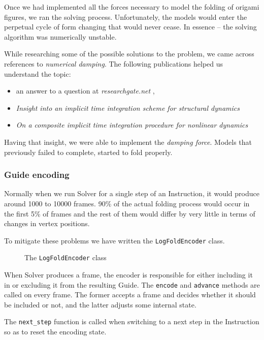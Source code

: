 Once we had implemented all the forces necessary to model the folding of origami figures, we ran the solving process.
Unfortunately, the models would enter the perpetual cycle of form changing that would never cease.
In essence -- the solving algorithm was numerically unstable.

While researching some of the possible solutions to the problem, 
we came across references to \textit{numerical damping}. 
The following publications helped us understand the topic: 

\begin{itemize}
	\item an answer to a question at \textit{researchgate.net} \cite{researchgate:what-is-damping},
	\item \textit{Insight into an implicit time integration scheme for structural dynamics} \cite{damping1}
	\item \textit{On a composite implicit time integration procedure for nonlinear dynamics} \cite{damping2}
\end{itemize}

Having that insight, we were able to implement the \textit{damping force}. Models that previously failed to complete, started to fold properly.
\subsubsection{Guide encoding}

Normally when we run Solver for a single step of an Instruction, it would produce around 
1000 to 10000 frames.
90\% of the actual folding process would occur in the first 5\% of frames and the rest of them would differ by very little in terms of changes in vertex positions.

To mitigate these problems we have written the \texttt{LogFoldEncoder} class.

\begin{figure}[H]
	\caption{The \texttt{LogFoldEncoder} class}
	
\end{figure}

When Solver produces a frame, the encoder is responsible for either including it in or excluding it from the resulting Guide.
The \texttt{encode} and \texttt{advance} methods are called on every frame.
The former accepts a frame and decides whether it should be included or not, 
and the latter adjusts some internal state.

The \texttt{next\_step} function is called when switching to a next step in the Instruction so as to reset the encoding state.


